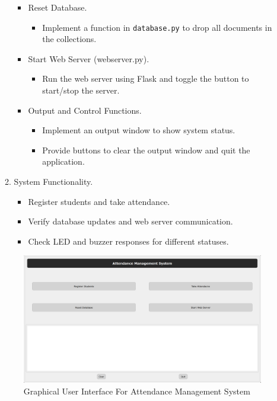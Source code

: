 \documentclass[12pt,a4paper]{report}
\begin{document}
\begin{enumerate}
\begin{enumerate}
\begin{itemize}
\begin{itemize}
						\end{itemize}
					\item Reset Database.
						\begin{itemize}
							\item Implement a function in \verb|database.py| to drop all documents in the collections.
						\end{itemize}
					\item Start Web Server (webserver.py).
						\begin{itemize}
							\item Run the web server using Flask and toggle the button to start/stop the server.
						\end{itemize}
					\item Output and Control Functions.
						\begin{itemize}
							\item Implement an output window to show system status.
							\item Provide buttons to clear the output window and quit the application.
						\end{itemize}
				\end{itemize}
			\item System Functionality.
				\begin{itemize}
					\item Register students and take attendance.
					\item Verify database updates and web server communication.
					\item Check LED and buzzer responses for different statuses.
				\end{itemize}
		\end{enumerate}

		\begin{figure}[H]
			\begin{center}
				\includegraphics[scale=0.2]{images/AMSFR_Screenshot-1.png}
			\end{center}
			\caption{Graphical User Interface For Attendance Management System}
		\end{figure}


\end{enumerate}
\end{document}
